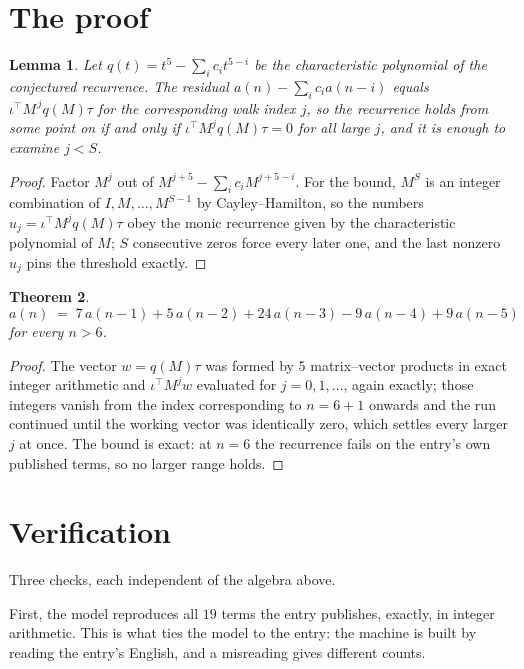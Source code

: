 \documentclass[11pt,a4paper]{article}
\theoremstyle{plain}
\newtheorem{theorem}{Theorem}
\newtheorem{lemma}[theorem]{Lemma}
\theoremstyle{definition}
\begin{document}
\section{The proof}

\begin{lemma}\label{lem:crit}
Let $q(t)=t^{5}-\sum_i c_it^{5-i}$ be the characteristic polynomial of the
conjectured recurrence. The residual $a(n)-\sum_ic_ia(n-i)$ equals
$\iota^{\!\top}M^{\,j}q(M)\tau$ for the corresponding walk index $j$, so the recurrence
holds from some point on if and only if $\iota^{\!\top}M^{j}q(M)\tau=0$ for all large $j$,
and it is enough to examine $j<S$.
\end{lemma}

\begin{proof}
Factor $M^{j}$ out of $M^{j+5}-\sum_ic_iM^{j+5-i}$. For the bound, $M^{S}$
is an integer combination of $I,M,\dots,M^{S-1}$ by Cayley--Hamilton, so the numbers
$u_j=\iota^{\!\top}M^{j}q(M)\tau$ obey the monic recurrence given by the characteristic
polynomial of $M$; $S$ consecutive zeros force every later one, and the last nonzero $u_j$
pins the threshold exactly.
\end{proof}

\begin{theorem}
\[
a(n)\;=\;7\,a(n-1) + 5\,a(n-2) + 24\,a(n-3) - 9\,a(n-4) + 9\,a(n-5)
\]
for every $n>6$.
\end{theorem}

\begin{proof}
The vector $w=q(M)\tau$ was formed by $5$ matrix--vector products in exact integer
arithmetic and $\iota^{\!\top}M^{j}w$ evaluated for $j=0,1,\dots$, again exactly; those
integers vanish from the index corresponding to $n=6+1$ onwards and the run continued
until the working vector was identically zero, which settles every larger $j$ at once. The bound is exact: at $n=6$ the recurrence fails on the entry's own published terms, so no larger range holds.
\end{proof}

\section{Verification}

Three checks, each independent of the algebra above.

First, the model reproduces all $19$ terms the entry publishes, exactly, in integer
arithmetic. This is what ties the model to the entry: the machine is built by reading the
entry's English, and a misreading gives different counts.
\end{document}
